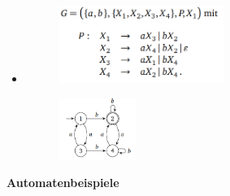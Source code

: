 \documentclass[11pt,a4paper]{article}
\begin{document}
\begin{itemize}
\begin{itemize}
	\item[]
				\begin{minipage}{0.4\textwidth}
					\begin{figure}[H]
					\includegraphics[height=2.5cm]{reggra3}
					\end{figure}
				\end{minipage}
				\begin{minipage}[t]{0.4\textwidth}
					\vspace{-1.25cm}
					\begin{figure}[H]
					\includegraphics[height=2cm]{reggra4}
					\end{figure}
				\end{minipage}
	\end{itemize}

\end{itemize}

\pagebreak



{\Large \textbf{Automatenbeispiele}}
\end{document}
